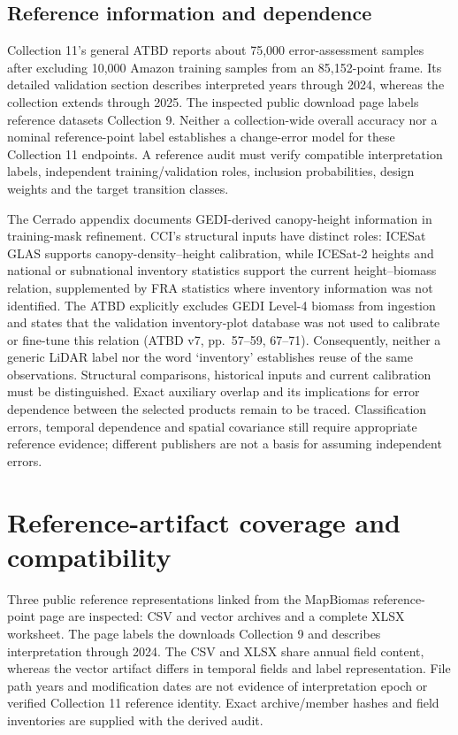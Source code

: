 \documentclass[11pt,a4paper]{article}
\begin{document}
\subsection{Reference information and dependence}
Collection 11's general ATBD reports about 75,000 error-assessment samples after excluding 10,000 Amazon training samples from an 85,152-point frame. Its detailed validation section describes interpreted years through 2024, whereas the collection extends through 2025. The inspected public download page labels reference datasets Collection 9. Neither a collection-wide overall accuracy nor a nominal reference-point label establishes a change-error model for these Collection 11 endpoints. A reference audit must verify compatible interpretation labels, independent training/validation roles, inclusion probabilities, design weights and the target transition classes.

The Cerrado appendix documents GEDI-derived canopy-height information in training-mask refinement. CCI's structural inputs have distinct roles: ICESat GLAS supports canopy-density--height calibration, while ICESat-2 heights and national or subnational inventory statistics support the current height--biomass relation, supplemented by FRA statistics where inventory information was not identified. The ATBD explicitly excludes GEDI Level-4 biomass from ingestion and states that the validation inventory-plot database was not used to calibrate or fine-tune this relation (ATBD v7, pp.~57--59, 67--71). Consequently, neither a generic LiDAR label nor the word `inventory' establishes reuse of the same observations. Structural comparisons, historical inputs and current calibration must be distinguished. Exact auxiliary overlap and its implications for error dependence between the selected products remain to be traced. Classification errors, temporal dependence and spatial covariance still require appropriate reference evidence; different publishers are not a basis for assuming independent errors.

\section{Reference-artifact coverage and compatibility}

Three public reference representations linked from the MapBiomas reference-point page are inspected: CSV and vector archives and a complete XLSX worksheet. The page labels the downloads Collection 9 and describes interpretation through 2024. The CSV and XLSX share annual field content, whereas the vector artifact differs in temporal fields and label representation. File path years and modification dates are not evidence of interpretation epoch or verified Collection 11 reference identity. Exact archive/member hashes and field inventories are supplied with the derived audit.
\end{document}
